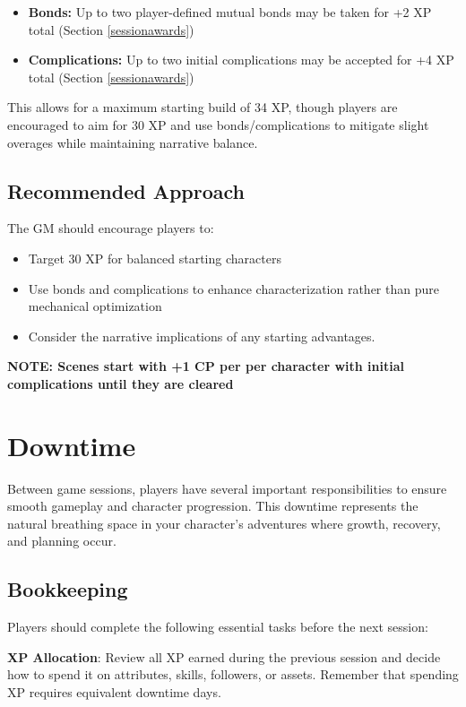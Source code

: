 \begin{itemize}
    \item \textbf{Bonds:} Up to two player-defined mutual bonds may be taken for +2 XP total (Section \ref{sessionawards})
    \item \textbf{Complications:} Up to two initial complications may be accepted for +4 XP total (Section \ref{sessionawards})
\end{itemize}

This allows for a maximum starting build of 34 XP, though players are encouraged to aim for 30 XP and use bonds/complications to mitigate slight overages while maintaining narrative balance.

\subsection{Recommended Approach}
The GM should encourage players to:
\begin{itemize}
    \item Target 30 XP for balanced starting characters
    \item Use bonds and complications to enhance characterization rather than pure mechanical optimization
    \item Consider the narrative implications of any starting advantages.
\end{itemize}
\textbf{NOTE: Scenes start with +1 CP per per character with initial complications until they are cleared}

\section{Downtime}

Between game sessions, players have several important responsibilities to ensure smooth gameplay and character progression. This downtime represents the natural breathing space in your character's adventures where growth, recovery, and planning occur.

\subsection{Bookkeeping}

Players should complete the following essential tasks before the next session:

\textbf{XP Allocation}: Review all XP earned during the previous session and decide how to spend it on attributes, skills, followers, or assets. Remember that spending XP requires equivalent downtime days.

